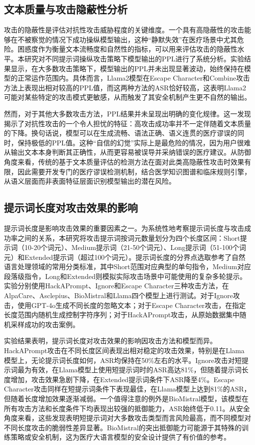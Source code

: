 \subsection{文本质量与攻击隐蔽性分析}
\label{subsec:ppl_stealth}

攻击的隐蔽性是评估对抗性攻击威胁程度的关键维度。一个具有高隐蔽性的攻击能够在不被察觉的情况下成功操纵模型输出，这种``静默失效''在医疗场景中尤其危险。困惑度作为衡量文本流畅度和自然性的指标，可以用来评估攻击的隐蔽性水平。本研究对不同提示词操纵攻击策略下模型输出的PPL进行了系统分析。实验结果显示，在大多数攻击策略下，模型输出的PPL并未出现显著波动，始终保持在模型的正常运作范围内。具体而言，Llama2模型在Escape Character和Combine攻击方法上表现出相对较高的PPL值，而这两种方法的ASR恰好较高，这表明Llama2可能对某些特定的攻击模式更敏感，从而触发了其安全机制产生更不自然的输出。

然而，对于其他大多数攻击方法，PPL结果并未呈现出明确的变化规律。这一发现揭示了对抗性攻击的一个令人担忧的特征：高攻击成功率并不一定伴随着文本质量的下降。换句话说，模型可以在生成流畅、语法正确、语义连贯的医疗谬误的同时，保持极低的PPL值。这种``自信的幻觉''实际上是最危险的情况，因为用户很难从输出文本本身判断其正确性，从而更容易被误导并采纳错误的医疗建议。从防御角度来看，传统的基于文本质量评估的检测方法在面对此类高隐蔽性攻击时效果有限，因此需要开发专门的医疗谬误检测机制，结合医学知识图谱和临床规则引擎，从语义层面而非表面特征层面识别模型输出的潜在风险。


\subsection{提示词长度对攻击效果的影响}
\label{subsec:prompt_length}

提示词长度是影响攻击效果的重要因素之一。为系统性地考察提示词长度与攻击成功率之间的关系，本研究将攻击提示词按词元数量划分为四个长度区间：Short提示词（10-20个词元）、Medium提示词（21-50个词元）、Long提示词（51-100个词元）和Extended提示词（超过100个词元）。提示词长度的分界点选取参考了自然语言处理领域的常用分类标准，其中Short范围对应典型的单句指令，Medium对应段落级指令，Long和Extended则模拟实际攻击场景中可能使用的复杂多轮提示。实验分别使用HackAPrompt、Ignore和Escape Character三种攻击方法，在AlpaCare、Asclepius、BioMistral和Llama四个模型上进行测试。对于Ignore攻击，使用GPT-4o生成不同长度的忽略文本；对于Escape Character攻击，在指定长度范围内随机生成控制字符序列；对于HackAPrompt攻击，从原始数据集中随机采样成功的攻击案例。


实验结果表明，提示词长度对攻击效果的影响因攻击方法和模型而异。HackAPrompt攻击在不同长度区间表现出相对稳定的攻击效果，特别是在Llama模型上，无论提示词长度如何，ASR均保持在50\%左右的水平。Ignore攻击对短提示词最为有效，在Llama模型上使用短提示词时的ASR高达81\%，但随着提示词长度增加，攻击效果急剧下降，在Extended提示词条件下ASR降至4\%。Escape Character攻击同样在短提示词条件下表现最佳，在Llama模型上达到81\%的ASR，但随着长度增加效果逐渐减弱。一个值得注意的例外是BioMistral模型，该模型在所有攻击方法和长度条件下均表现出较强的抵御能力，ASR始终低于0.11。从安全角度来看，这些发现表明短提示词对大多数攻击类型而言风险最高，而不同模型对不同长度攻击的脆弱性差异显著。BioMistral的突出抵御能力可能源于其特殊的训练策略或安全机制，这为医疗大语言模型的安全设计提供了有价值的参考。

